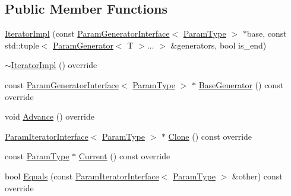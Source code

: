 \subsection*{Public Member Functions}
\begin{DoxyCompactItemize}
\item 
\hyperlink{classtesting_1_1internal_1_1CartesianProductGenerator_1_1IteratorImpl_3_01IndexSequence_3_01I_8_8_8_01_4_01_4_a3c28d20b4527f146a97c5490326f869f}{Iterator\+Impl} (const \hyperlink{classtesting_1_1internal_1_1ParamGeneratorInterface}{Param\+Generator\+Interface}$<$ \hyperlink{classtesting_1_1internal_1_1CartesianProductGenerator_af27131157a9347f0c82420ca081ee7dd}{Param\+Type} $>$ $\ast$base, const std\+::tuple$<$ \hyperlink{classtesting_1_1internal_1_1ParamGenerator}{Param\+Generator}$<$ T $>$... $>$ \&generators, bool is\+\_\+end)
\item 
\hyperlink{classtesting_1_1internal_1_1CartesianProductGenerator_1_1IteratorImpl_3_01IndexSequence_3_01I_8_8_8_01_4_01_4_adf6a47392283d7e236b604f487cf8cfc}{$\sim$\+Iterator\+Impl} () override
\item 
const \hyperlink{classtesting_1_1internal_1_1ParamGeneratorInterface}{Param\+Generator\+Interface}$<$ \hyperlink{classtesting_1_1internal_1_1CartesianProductGenerator_af27131157a9347f0c82420ca081ee7dd}{Param\+Type} $>$ $\ast$ \hyperlink{classtesting_1_1internal_1_1CartesianProductGenerator_1_1IteratorImpl_3_01IndexSequence_3_01I_8_8_8_01_4_01_4_a8fa3ea322a1348fc8065481aba76e860}{Base\+Generator} () const override
\item 
void \hyperlink{classtesting_1_1internal_1_1CartesianProductGenerator_1_1IteratorImpl_3_01IndexSequence_3_01I_8_8_8_01_4_01_4_a167e8b38118c8635d5849daf924a517b}{Advance} () override
\item 
\hyperlink{classtesting_1_1internal_1_1ParamIteratorInterface}{Param\+Iterator\+Interface}$<$ \hyperlink{classtesting_1_1internal_1_1CartesianProductGenerator_af27131157a9347f0c82420ca081ee7dd}{Param\+Type} $>$ $\ast$ \hyperlink{classtesting_1_1internal_1_1CartesianProductGenerator_1_1IteratorImpl_3_01IndexSequence_3_01I_8_8_8_01_4_01_4_a0b434e09b32dfd6b444085cf95dc22ab}{Clone} () const override
\item 
const \hyperlink{classtesting_1_1internal_1_1CartesianProductGenerator_af27131157a9347f0c82420ca081ee7dd}{Param\+Type} $\ast$ \hyperlink{classtesting_1_1internal_1_1CartesianProductGenerator_1_1IteratorImpl_3_01IndexSequence_3_01I_8_8_8_01_4_01_4_ab7052f320ab8ff3113a3e744a1bff07e}{Current} () const override
\item 
bool \hyperlink{classtesting_1_1internal_1_1CartesianProductGenerator_1_1IteratorImpl_3_01IndexSequence_3_01I_8_8_8_01_4_01_4_a7ba6129ccd025c1cb0e00fe71b8c8489}{Equals} (const \hyperlink{classtesting_1_1internal_1_1ParamIteratorInterface}{Param\+Iterator\+Interface}$<$ \hyperlink{classtesting_1_1internal_1_1CartesianProductGenerator_af27131157a9347f0c82420ca081ee7dd}{Param\+Type} $>$ \&other) const override
\end{DoxyCompactItemize}
